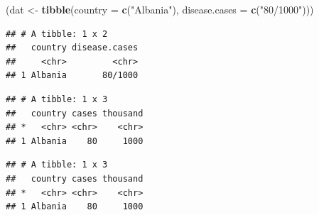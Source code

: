 \documentclass[]{book}
\newenvironment{Shaded}{\begin{snugshade}}{\end{snugshade}}
\newcommand{\KeywordTok}[1]{\textcolor[rgb]{0.13,0.29,0.53}{\textbf{#1}}}
\newcommand{\DataTypeTok}[1]{\textcolor[rgb]{0.13,0.29,0.53}{#1}}
\newcommand{\DecValTok}[1]{\textcolor[rgb]{0.00,0.00,0.81}{#1}}
\newcommand{\StringTok}[1]{\textcolor[rgb]{0.31,0.60,0.02}{#1}}
\newcommand{\OperatorTok}[1]{\textcolor[rgb]{0.81,0.36,0.00}{\textbf{#1}}}
\newcommand{\NormalTok}[1]{#1}
\begin{document}
\begin{Shaded}
\begin{Highlighting}[]
\NormalTok{(dat <-}\StringTok{ }\KeywordTok{tibble}\NormalTok{(}\DataTypeTok{country =} \KeywordTok{c}\NormalTok{(}\StringTok{"Albania"}\NormalTok{), }\DataTypeTok{disease.cases =} \KeywordTok{c}\NormalTok{(}\StringTok{"80/1000"}\NormalTok{)))}
\end{Highlighting}
\end{Shaded}

\begin{verbatim}
## # A tibble: 1 x 2
##   country disease.cases
##     <chr>         <chr>
## 1 Albania       80/1000
\end{verbatim}

\begin{Shaded}
\end{Shaded}

\begin{verbatim}
## # A tibble: 1 x 3
##   country cases thousand
## *   <chr> <chr>    <chr>
## 1 Albania    80     1000
\end{verbatim}

\begin{Shaded}
\end{Shaded}

\begin{verbatim}
## # A tibble: 1 x 3
##   country cases thousand
## *   <chr> <chr>    <chr>
## 1 Albania    80     1000
\end{verbatim}

\begin{Shaded}
\end{Shaded}
\end{document}
